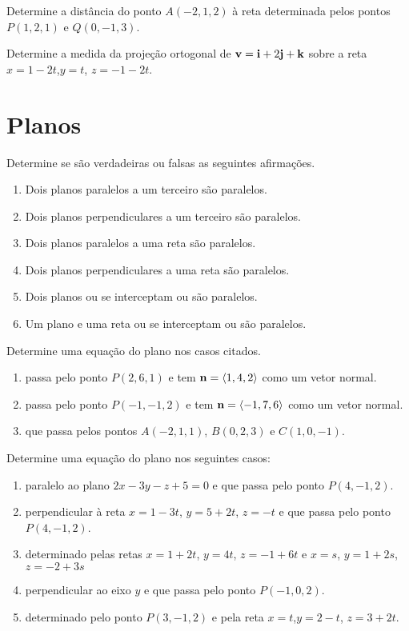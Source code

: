 \item Determine a distância do ponto $A(-2,1,2)$ à reta determinada pelos pontos $P(1,2,1)$ e $Q(0,-1,3)$.
\item Determine a medida da projeção ortogonal de $\mathbf{v}=\mathbf{i} + 2\mathbf{j} + \mathbf{k}$ sobre a reta $x=1-2t$,$y=t$, $z=-1-2t$.
\section{Planos}
\item Determine se são verdadeiras ou falsas as seguintes afirmações.
\begin{enumerate}[leftmargin=*]
    \item  Dois planos paralelos a um terceiro são paralelos.
    \item  Dois planos perpendiculares a um terceiro são paralelos.
    \item  Dois planos paralelos a uma reta são paralelos.
    \item  Dois planos perpendiculares a uma reta são paralelos.
    \item  Dois planos ou se interceptam ou são paralelos.
    \item  Um plano e uma reta ou se interceptam ou são paralelos.
\end{enumerate}


\item Determine uma equação do plano nos casos citados.

\begin{enumerate}[leftmargin=*]
\item passa pelo ponto $P(2, 6, 1)$ e tem $\mathbf{n}= \langle 1, 4, 2\rangle$ como um vetor normal. 

\item passa pelo ponto $P(-1, -1, 2)$ e tem $\mathbf{n}=\langle -1, 7, 6\rangle$ como um vetor normal. 

\item que passa pelos pontos $A(-2, 1, 1)$, $B(0, 2, 3)$ e $C(1, 0, -1)$.

\end{enumerate}
\item Determine uma equação do plano nos seguintes casos:
\begin{enumerate}[leftmargin=*]
    \item paralelo ao plano $2x-3y-z+5=0$ e que passa pelo ponto $P(4,-1,2)$.
    \item perpendicular à reta $x=1-3t$, $y=5+2t$, $z=-t$ e que passa pelo ponto $P(4,-1,2)$.
    \item determinado pelas retas  $x=1+2t$, $y=4t$, $z=-1+6t$ e  $x=s$, $y=1+2s$, $z=-2+3s$
    \item perpendicular ao eixo $y$ e que passa pelo ponto $P(-1,0,2)$.
    \item determinado pelo ponto $P(3,-1,2)$ e pela reta $x=t$,$y=2-t$, $z=3+2t$.
\end{enumerate}


